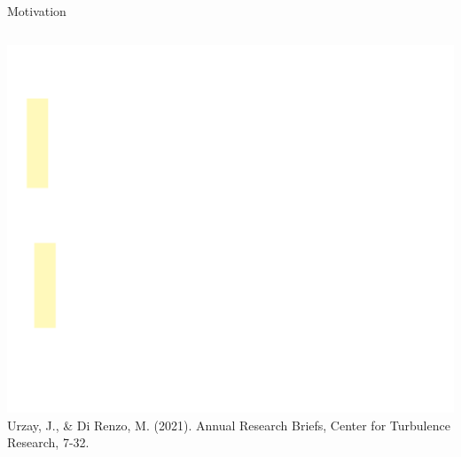 \documentclass[9pt, aspectratio=1609]{beamer}
\begin{document}
\begin{frame}{\large Motivation}
\begin{columns}[c, onlytextwidth]
    \begin{column}{.6\textwidth}
        \begin{center}
            \includegraphics[scale=0.2]{figures/huete2021/intro_2.pdf}
            \scriptsize{Urzay, J., \& Di Renzo, M. (2021). Annual Research Briefs, Center for Turbulence Research, 7-32.}
        \end{center}
    \end{column}%
\end{columns}

\end{frame}
\end{document}
